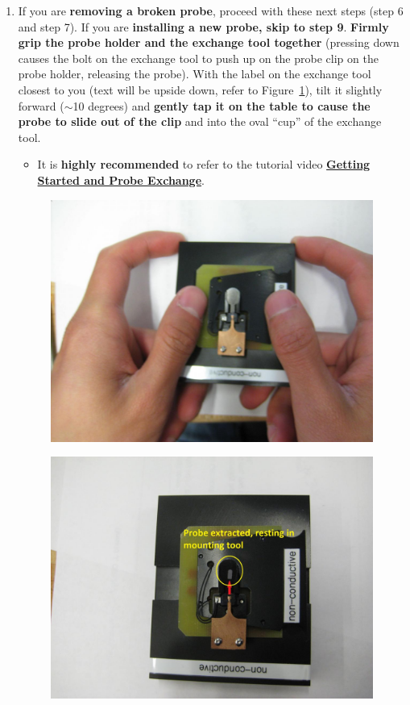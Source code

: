 \documentclass{../lab}
\begin{document}
\begin{enumerate}
    \item If you are \textbf{removing a broken probe}, proceed with these next steps (step 6 and step 7). If you are\textbf{ installing a new probe, skip to step 9}. \textbf{Firmly grip the probe holder and the exchange tool together} (pressing down causes the bolt on the exchange tool to push up on the probe clip on the probe holder, releasing the probe).  With the label on the exchange tool closest to you (text will be upside down, refer to Figure~\ref{fig:HoldingTool}), tilt it slightly forward ($\sim$10 degrees) and \textbf{gently tap it on the table to cause the probe to slide out of the clip} and into the oval ``cup'' of the exchange tool.
    \begin{itemize}
        \item It is \textbf{highly recommended} to refer to the tutorial video \href{http://experimentationlab.berkeley.edu/sites/default/files/gettingstarted\_final2.mp4}{\textbf{Getting Started and Probe Exchange}}.
    \end{itemize}

    \begin{figure}[H]
        \centering
        \href{http://experimentationlab.berkeley.edu/sites/default/files/AFMImages/18.JPG}{\includegraphics[width=0.5\linewidth]{images/18.JPG}}
        \caption{}
        \label{fig:HoldingTool}
    \end{figure}
    
    \begin{figure}[H]
        \centering
        \href{http://experimentationlab.berkeley.edu/sites/default/files/AFMImages/19.JPG}{\includegraphics[width=0.5\linewidth]{images/19.JPG}}
        \caption{}
    \end{figure}
    

\end{enumerate}
\end{document}
